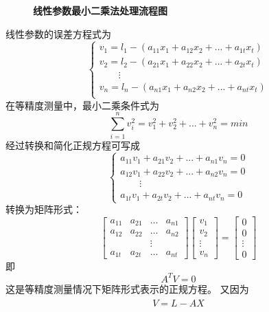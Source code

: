 \begin{enumerate}
\begin{figure}[H]
\begin{tikzpicture}[
	>=latex,
	node distance=5mm,
	chuli/.style={draw,rectangle,minimum size=6mm,thick}
	]
	\end{tikzpicture}
	\caption{\textbf{线性参数最小二乘法处理流程图}}
\end{figure}
线性参数的误差方程式为
\begin{equation} \begin{cases}
	v_1 = l_1-(a_{11}x_1+a_{12}x_2+...+a_{1t}x_t)\\
	v_2 = l_2-(a_{21}x_1+a_{22}x_2+...+a_{2t}x_t)\\
	\qquad \vdots\\
	v_n = l_n-(a_{n1}x_1+a_{n2}x_2+...+a_{nt}x_t)\\
\end{cases} \end{equation}
在等精度测量中，最小二乘条件式为\begin{equation} \sum_{i=1}^{n}v_i^2=v_1^2+v_2^2+...+v_n^2=min \end{equation}
经过转换和简化正规方程可写成
\begin{equation} \begin{cases}
	a_{11}v_1+a_{21}v_2+...+a_{n1}v_n=0\\
	a_{12}v_1+a_{22}v_2+...+a_{n2}v_n=0\\
	\qquad \vdots\\
	a_{1t}v_1+a_{2t}v_2+...+a_{nt}v_n=0
\end{cases} \end{equation}
转换为矩阵形式：
\begin{equation} \begin{bmatrix}
	a_{11}&a_{21}&\dots&a_{n1}\\
	a_{12}&a_{22}&\dots&a_{n2}\\
		  & 	 &\vdots\\
	a_{1t}&a_{2t}&\dots&a_{nt}
\end{bmatrix}\begin{bmatrix}
	v_1\\v_2\\\vdots\\v_n
\end{bmatrix}=\begin{bmatrix}
	0\\0\\\vdots\\0
\end{bmatrix} \end{equation}
即\begin{equation} A^TV=0 \end{equation}
这是等精度测量情况下矩阵形式表示的正规方程。
又因为\begin{equation} V=L-A\hat{X} \end{equation}

\end{enumerate}
